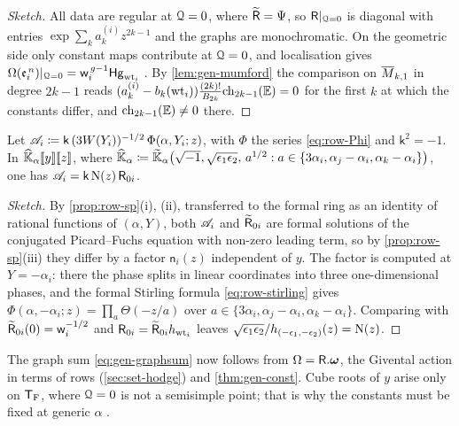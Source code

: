\begin{proof}[Sketch]
All data are regular at $\mathcal{Q}=0$, where $\widetilde{\mathsf{R}}=\Psi$, so $\mathsf{R}|_{\mathcal{Q}=0}$ is diagonal with entries $\exp\sum_ka_k^{(i)}z^{2k-1}$ and the graphs are monochromatic. On the geometric side only constant maps contribute at $\mathcal{Q}=0$, and localisation gives $\Omega(\mathfrak{e}_i^{\,n})|_{\mathcal{Q}=0}=\mathsf{w}_i^{\,g-1}\mathsf{Hg}_{\mathrm{wt}_i}$ . By \cref{lem:gen-mumford} the comparison on $\overline{M}_{k,1}$ in degree $2k-1$ reads $(a_k^{(i)}-b_k(\mathrm{wt}_i))\frac{(2k)!}{B_{2k}}\mathrm{ch}_{2k-1}(\mathbb{E})=0$ for the first $k$ at which the constants differ, and $\mathrm{ch}_{2k-1}(\mathbb{E})\neq0$ there.
\end{proof}

\begin{prop}
\label{prop:gen-osc}
Let $\mathscr{A}_i\coloneqq\mathsf{k}\,(3W(Y_i))^{-1/2}\,\Phi(\alpha,Y_i;z)$, with $\Phi$ the series \eqref{eq:row-Phi} and $\mathsf{k}^2=-1$. In $\widehat{\mathbb{K}}_{\alpha}[\![ y ]\!][\![ z ]\!]$, where $\widehat{\mathbb{K}}_{\alpha}\coloneqq\widetilde{\mathbb{K}}_{\alpha}\big(\sqrt{-1},\sqrt{\epsilon_1\epsilon_2},\,a^{1/2}:a\in\{3\alpha_i,\alpha_j-\alpha_i,\alpha_k-\alpha_i\}\big)$, one has $\mathscr{A}_i=\mathsf{k}\,\mathrm{N}(z)\,\mathsf{R}_{0i}$.
\end{prop}

\begin{proof}[Sketch]
By \cref{prop:row-sp}\textup{(i), (ii)}, transferred to the formal ring as an identity of rational functions of $(\alpha,Y)$, both $\mathscr{A}_i$ and $\widetilde{\mathsf{R}}_{0i}$ are formal solutions of the conjugated Picard--Fuchs equation with non-zero leading term, so by \cref{prop:row-sp}\textup{(iii)} they differ by a factor $\mathsf{n}_i(z)$ independent of $y$. The factor is computed at $Y=-\alpha_i$: there the phase splits in linear coordinates into three one-dimensional phases, and the formal Stirling formula \eqref{eq:row-stirling} gives $\Phi(\alpha,-\alpha_i;z)=\prod_a\Theta(-z/a)$ over $a\in\{3\alpha_i,\alpha_j-\alpha_i,\alpha_k-\alpha_i\}$. Comparing with $\widetilde{\mathsf{R}}_{0i}(0)=\mathsf{w}_i^{-1/2}$ and $\mathsf{R}_{0i}=\widetilde{\mathsf{R}}_{0i}h_{\mathrm{wt}_i}$ leaves $\sqrt{\epsilon_1\epsilon_2}/h_{(-\epsilon_1,-\epsilon_2)}(z)=\mathrm{N}(z)$.
\end{proof}

The graph sum \eqref{eq:gen-graphsum} now follows from $\Omega=\mathsf{R}.\boldsymbol{\omega}$, the Givental action in terms of rows (\cref{sec:set-hodge}) and \cref{thm:gen-const}. Cube roots of $y$ arise only on $\mathsf{T}_{\mathrm{F}}$, where $\mathcal{Q}=0$ is not a semisimple point; that is why the constants must be fixed at generic $\alpha$ .
